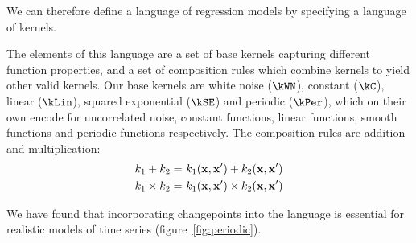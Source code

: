 We can therefore define a language of regression models by specifying a language of kernels.

The elements of this language are a set of  base kernels capturing different function properties, and a set of
composition rules which combine kernels to yield other valid kernels.
Our base kernels are white noise ($\kWN$), constant ($\kC$), linear ($\kLin$), squared exponential ($\kSE$) and periodic ($\kPer$), which on their own encode for uncorrelated noise, constant functions, linear functions, smooth functions and periodic functions respectively.
The composition rules are addition and multiplication:
\begin{align}
k_1 + k_2 =      & \,\, k_1({\bf{x}}, {\bf{x}}') + k_2({\bf{x}}, {\bf{x}}') \\
k_1 \times k_2 = & \,\, k_1({\bf{x}}, {\bf{x}}') \times k_2({\bf{x}}, {\bf{x}}')
\end{align}


We have found that incorporating changepoints into the language is essential for realistic models of time series (\eg figure~\ref{fig:periodic}).




